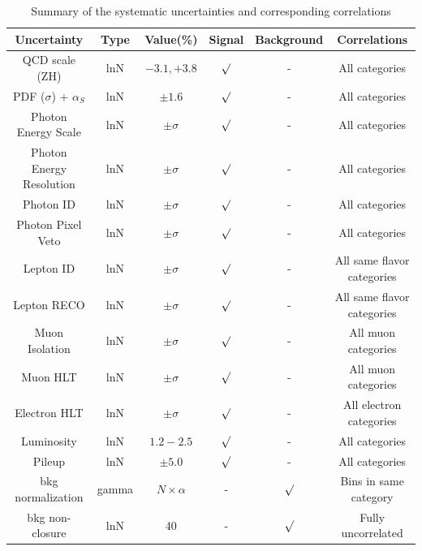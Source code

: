 \begin{table}[htb!]
	\small
	\caption[Summary of the systematic uncertainties and corresponding correlations]{Summary of the systematic uncertainties and corresponding correlations}  
	\label{tab:systs}
	\centering  
	\begin{tabular}{|c|c|c|c|c|c|} 
		\hline
		Uncertainty    &	Type	& Value(\%)  &  Signal      & Background      &  Correlations\\
		\hline
		QCD scale (ZH) & lnN 	&	$-3.1,+3.8$ & $\surd$     & -               & All categories\\ 
		PDF ($\sigma$) + $\alpha_S$ & lnN	& $\pm 1.6$   & $\surd$     & -               & All categories\\ 
		Photon Energy Scale & lnN & $\pm \sigma$ & $\surd$ & - & All categories\\
		Photon Energy Resolution & lnN & $\pm \sigma$ & $\surd$ & - & All categories\\
		Photon ID 	 & lnN	& $\pm \sigma$ 	& $\surd$ & - & All categories\\
		Photon Pixel Veto & lnN & $\pm \sigma$ 	& $\surd$ & - & All categories\\
		Lepton ID      & lnN 	& $\pm \sigma$   & $\surd$     & -               & All same flavor categories\\ 
		Lepton RECO      & lnN 	& $\pm \sigma$   & $\surd$     & -               & All same flavor categories\\ 
		Muon Isolation      & lnN 	& $\pm \sigma$   & $\surd$     & -               & All muon categories\\ 
		Muon HLT      & lnN 	& $\pm \sigma$   & $\surd$     & -               & All muon categories\\ 
		Electron HLT 	 & lnN	& $\pm \sigma$	  &	$\surd$		& -				  & All electron categories\\
		Luminosity     & lnN	& $1.2-2.5$   & $\surd$     & -               & All categories\\ 
		Pileup	&	lnN	&	$\pm 5.0$ & $\surd$ & - &	All categories \\
		bkg normalization  & gamma & $N\times\alpha$& -  & $\surd$         & Bins in same category\\ 
		bkg non-closure          & lnN & 40 & -  & $\surd$                  & Fully uncorrelated \\ 
		\hline
	\end{tabular}
\end{table}

